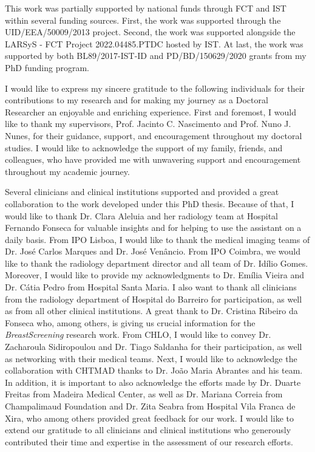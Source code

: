
This work was partially supported by national funds through FCT and IST within several funding sources.
First, the work was supported through the UID/EEA/50009/2013 project.
Second, the work was supported alongside the LARSyS - FCT Project 2022.04485.PTDC hosted by IST.
At last, the work was supported by both BL89/2017-IST-ID and PD/BD/150629/2020 grants from my PhD funding program.

I would like to express my sincere gratitude to the following individuals for their contributions to my research and for making my journey as a Doctoral Researcher an enjoyable and enriching experience.
First and foremost, I would like to thank my supervisors, Prof. Jacinto C. Nascimento and Prof. Nuno J. Nunes, for their guidance, support, and encouragement throughout my doctoral studies.
I would like to acknowledge the support of my family, friends, and colleagues, who have provided me with unwavering support and encouragement throughout my academic journey.

Several clinicians and clinical institutions supported and provided a great collaboration to the work developed under this PhD thesis.
Because of that, I would like to thank Dr. Clara Aleluia and her radiology team at Hospital Fernando Fonseca for valuable insights and for helping to use the assistant on a daily basis.
From IPO Lisboa, I would like to thank the medical imaging teams of Dr. Jos\'{e} Carlos Marques and Dr. Jos\'{e} Ven\^{a}ncio.
From IPO Coimbra, we would like to thank the radiology department director and all team of Dr. Id\'{i}lio Gomes.
Moreover, I would like to provide my acknowledgments to Dr. Em\'{i}lia Vieira and Dr. C\'{a}tia Pedro from Hospital Santa Maria.
I also want to thank all clinicians from the radiology department of Hospital do Barreiro for participation, as well as from all other clinical institutions.
A great thank to Dr. Cristina Ribeiro da Fonseca who, among others, is giving us crucial information for the {\it BreastScreening} research work.
From CHLO, I would like to convey Dr. Zacharoula Sidiropoulou and Dr. Tiago Saldanha for their participation, as well as networking with their medical teams.
Next, I would like to acknowledge the collaboration with CHTMAD thanks to Dr. Jo\~{a}o Maria Abrantes and his team.
In addition, it is important to also acknowledge the efforts made by Dr. Duarte Freitas from Madeira Medical Center, as well as Dr. Mariana Correia from Champalimaud Foundation and Dr. Zita Seabra from Hospital Vila Franca de Xira, who among others provided great feedback for our work.
I would like to extend our gratitude to all clinicians and clinical institutions who generously contributed their time and expertise in the assessment of our research efforts.

